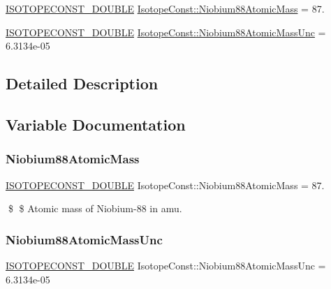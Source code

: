 \begin{DoxyCompactItemize}
\item 
\mbox{\hyperlink{group___isotope_const-_macros_ga8f45a7272ce02c0b4c65c44636ed719a}{I\+S\+O\+T\+O\+P\+E\+C\+O\+N\+S\+T\+\_\+\+D\+O\+U\+B\+LE}} \mbox{\hyperlink{group___isotope_const-_niobium-_nb88_gadc3a894ebfc0db82af828017a5ed4d52}{Isotope\+Const\+::\+Niobium88\+Atomic\+Mass}} = 87.
\item 
\mbox{\hyperlink{group___isotope_const-_macros_ga8f45a7272ce02c0b4c65c44636ed719a}{I\+S\+O\+T\+O\+P\+E\+C\+O\+N\+S\+T\+\_\+\+D\+O\+U\+B\+LE}} \mbox{\hyperlink{group___isotope_const-_niobium-_nb88_ga532d1e3714782dfdd0d4fc1dae09e66b}{Isotope\+Const\+::\+Niobium88\+Atomic\+Mass\+Unc}} = 6.\+3134e-\/05
\end{DoxyCompactItemize}


\subsection{Detailed Description}


\subsection{Variable Documentation}
\mbox{\label{group___isotope_const-_niobium-_nb88_gadc3a894ebfc0db82af828017a5ed4d52}} 
\subsubsection{\texorpdfstring{Niobium88\+Atomic\+Mass}{Niobium88AtomicMass}}
{\footnotesize\ttfamily \mbox{\hyperlink{group___isotope_const-_macros_ga8f45a7272ce02c0b4c65c44636ed719a}{I\+S\+O\+T\+O\+P\+E\+C\+O\+N\+S\+T\+\_\+\+D\+O\+U\+B\+LE}} Isotope\+Const\+::\+Niobium88\+Atomic\+Mass = 87.}

\$ \$ Atomic mass of Niobium-\/88 in amu. \mbox{\label{group___isotope_const-_niobium-_nb88_ga532d1e3714782dfdd0d4fc1dae09e66b}} 
\subsubsection{\texorpdfstring{Niobium88\+Atomic\+Mass\+Unc}{Niobium88AtomicMassUnc}}
{\footnotesize\ttfamily \mbox{\hyperlink{group___isotope_const-_macros_ga8f45a7272ce02c0b4c65c44636ed719a}{I\+S\+O\+T\+O\+P\+E\+C\+O\+N\+S\+T\+\_\+\+D\+O\+U\+B\+LE}} Isotope\+Const\+::\+Niobium88\+Atomic\+Mass\+Unc = 6.\+3134e-\/05}

